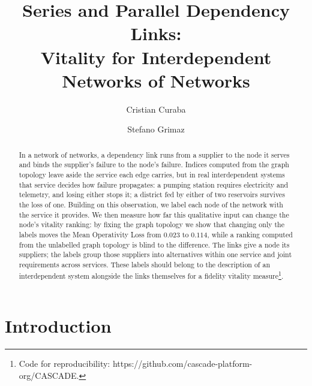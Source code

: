 \documentclass{svproc}
\begin{document}
\mainmatter

\title{Series and Parallel Dependency Links:\\ Vitality for Interdependent Networks of Networks}

\author{Cristian Curaba \and Stefano Grimaz}


\maketitle

\begin{abstract}
In a network of networks, a dependency link runs from a supplier to the node it
serves and binds the supplier's failure to the node's failure. Indices computed from the
graph topology leave aside the service each edge carries, but in real
interdependent systems that service decides how failure propagates: a pumping
station requires electricity and telemetry, and losing either stops it; a
district fed by either of two reservoirs survives the loss of one.
Building on this observation, we label each node of the network with the service it provides.
We then measure how far this qualitative input can change the node's vitality ranking: 
by fixing the graph topology we show that changing only the labels moves the Mean Operativity Loss from $0.023$ to $0.114$,
while a ranking computed from the unlabelled graph topology is blind to the
difference. The links give a node its suppliers; the labels group those suppliers
into alternatives within one service and joint requirements across services. 
These labels should belong to the description of
an interdependent system alongside the links themselves for a fidelity vitality measure\footnote{Code for reproducibility: https://github.com/cascade-platform-org/CASCADE.}.

\end{abstract}

\section{Introduction}
\label{sec:intro}
\end{document}
